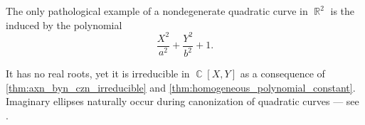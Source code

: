 \begin{example}\label{ex:imaginary_ellipse}
  The only pathological example of a nondegenerate quadratic curve in \( \BbbR^2 \) is the  induced by the polynomial
  \begin{equation}\label{eq:ex:imaginary_ellipse}
    \frac {X^2} {a^2} + \frac {Y^2} {b^2} + 1.
  \end{equation}

  It has no real roots, yet it is irreducible in \( \BbbC[X, Y] \) as a consequence of \cref{thm:axn_byn_czn_irreducible} and \cref{thm:homogeneous_polynomial_constant}. Imaginary ellipses naturally occur during canonization of quadratic curves --- see .
\end{example}

